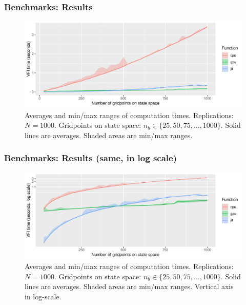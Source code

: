 \documentclass[10pt, aspectratio=1610]{beamer}
\begin{document}
\begin{frame}
  \frametitle{Benchmarks: Results}

  \begin{figure}
    \centering
    \includegraphics[width=\textwidth, height=0.65\textheight, keepaspectratio]{./img/benchmarks.pdf}
    \caption{\scriptsize
      Averages and min/max ranges of computation times.
      Replications: $N = 1000$.
      Gridpoints on state space: $n_b \in \{ 25, 50, 75, \ldots, 1000 \}$.
      Solid lines are averages.
      Shaded areas are min/max ranges.
    }
  \end{figure}

\end{frame}

\begin{frame}
  \frametitle{Benchmarks: Results (same, in log scale)}

  \begin{figure}
    \centering
    \includegraphics[width=\textwidth, height=0.65\textheight, keepaspectratio]{./img/benchmarks-logscale.pdf}
    \caption{\scriptsize
      Averages and min/max ranges of computation times.
      Replications: $N = 1000$.
      Gridpoints on state space: $n_b \in \{ 25, 50, 75, \ldots, 1000 \}$.
      Solid lines are averages.
      Shaded areas are min/max ranges.
      Vertical axis in log-scale.
    }
  \end{figure}

\end{frame}
\end{document}
